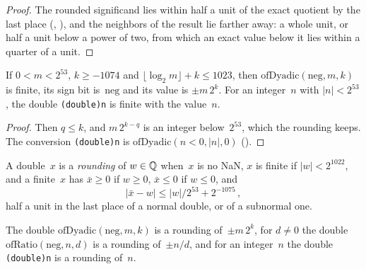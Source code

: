 \begin{proof}
  \leanok
  The rounded significand lies within half a unit of the exact quotient by the last place
  (, ), and the
  neighbors of the result lie farther away: a whole unit, or half a unit below a power of two, from
  which an exact value below it lies within a quarter of a unit.
\end{proof}

\begin{lemma}\label{lem:Double.ofDyadic_exact}
  \leanok
  If $0 < m < 2^{53}$, $k \ge -1074$ and $\lfloor \log_2 m \rfloor + k \le 1023$, then
  $\mathrm{ofDyadic}(\mathrm{neg}, m, k)$ is finite, its sign bit is~$\mathrm{neg}$ and its value is
  $\pm m\,2^k$. For an integer~$n$ with $|n| < 2^{53}$, the double \texttt{(double)n} is finite with
  the value~$n$.
\end{lemma}

\begin{proof}
  \leanok
  Then $q \le k$, and $m\,2^{k - q}$ is an integer below~$2^{53}$, which the rounding keeps. The
  conversion \texttt{(double)n} is $\mathrm{ofDyadic}(n < 0, |n|, 0)$
  ().
\end{proof}

\begin{definition}\label{def:Double.IsRounding}
  \leanok
  A double~$x$ is a \emph{rounding} of $w \in \mathbb{Q}$ when~$x$ is no NaN, $x$ is finite if
  $|w| < 2^{1022}$, and a finite~$x$ has $\bar x \ge 0$ if $w \ge 0$, $\bar x \le 0$ if $w \le 0$,
  and
  \[ |\bar x - w| \le |w|/2^{53} + 2^{-1075}\,, \]
  half a unit in the last place of a normal double, or of a subnormal one.
\end{definition}

\begin{lemma}\label{lem:Double.isRounding_ofDyadic}
  \leanok
  The double $\mathrm{ofDyadic}(\mathrm{neg}, m, k)$ is a rounding of~$\pm m\,2^k$, for $d \ne 0$
  the double $\mathrm{ofRatio}(\mathrm{neg}, n, d)$ is a rounding of~$\pm n/d$, and for an
  integer~$n$ the double \texttt{(double)n} is a rounding of~$n$.
\end{lemma}

